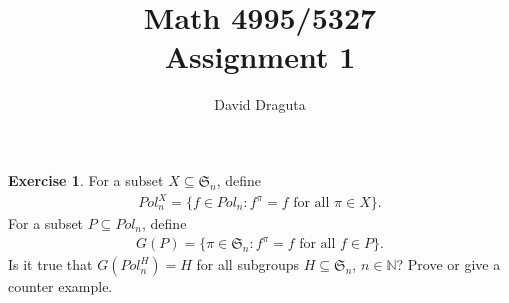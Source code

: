 \documentclass[12pt]{extarticle}
\title{ Math 4995/5327
  \\
  Assignment 1}
\author{David Draguta}
\newcommand{\set}[1]{\{#1\}}
\newcommand{\N}{\mathbb{N}}
\newcommand{\<}{\langle}
\renewcommand{\>}{\rangle}
\theoremstyle{definition}
\newtheorem{exercise}{Exercise}
\begin{document}
\maketitle

\begin{exercise}
  For a subset $X \subseteq \mathfrak{S}_n$, define
  \begin{align*}
    Pol_n^{X} = \set{f \in Pol_n: f^{\pi} = f \text{ for all } \pi \in X}.
  \end{align*}
  For a subset $P \subseteq Pol_n$, define
  \begin{align*}
    G(P) = \set{\pi \in \mathfrak{S}_n: f^{\pi} = f \text{ for all } f \in P}.
  \end{align*}
  Is it true that $G(Pol_n^H) = H$ for all subgroups $H \subseteq \mathfrak{S}_n$, $n \in \N$? Prove or give a counter example. 
\end{exercise}
\end{document}
